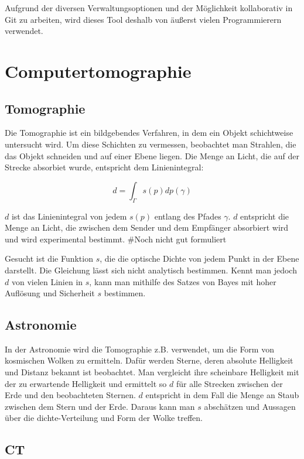 \documentclass[]{dsadokumentation}
\begin{document}
Aufgrund der diversen Verwaltungsoptionen und der Möglichkeit kollaborativ in Git zu arbeiten, wird dieses Tool deshalb von äußerst vielen Programmierern verwendet.

\section{Computertomographie}\label{k4.2.comptomo.ct}
\subsection{Tomographie}

Die Tomographie ist ein bildgebendes Verfahren, in dem ein Objekt schichtweise untersucht wird. Um diese Schichten zu vermessen, beobachtet man Strahlen, die das Objekt schneiden und auf einer Ebene liegen. Die Menge an Licht, die auf der Strecke absorbiet wurde, entspricht dem Linienintegral:

$$d=\int_{\Gamma}{}s(p)dp(\gamma)$$

$d$ ist das Linienintegral von jedem $s(p)$ entlang des Pfades $\gamma$. $d$ entspricht die Menge an Licht, die zwischen dem Sender und dem Empfänger absorbiert wird und wird experimental bestimmt. \#Noch nicht gut formuliert%

Gesucht ist die Funktion $s$, die die optische Dichte von jedem Punkt in der Ebene darstellt. Die Gleichung lässt sich nicht analytisch bestimmen. Kennt man jedoch $d$ von vielen Linien in $s$, kann man mithilfe des Satzes von Bayes mit hoher Auflösung und Sicherheit $s$ bestimmen.

\subsection{Astronomie}

In der Astronomie wird die Tomographie z.B. verwendet, um die Form von kosmischen Wolken zu ermitteln. Dafür werden Sterne, deren absolute Helligkeit und Distanz bekannt ist beobachtet. Man vergleicht ihre scheinbare Helligkeit mit der zu erwartende Helligkeit und ermittelt so $d$ für alle Strecken zwischen der Erde und den beobachteten Sternen. $d$ entspricht in dem Fall die Menge an Staub zwischen dem Stern und der Erde. Daraus kann man $s$ abschätzen und Aussagen über die dichte-Verteilung und Form der Wolke treffen.

\subsection{CT}
\end{document}
